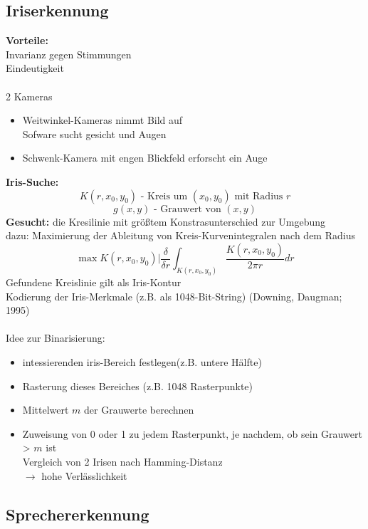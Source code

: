 \documentclass[a4paper,12pt]{scrreprt}
\newcommand{\Nb}[1]{\textbf{#1}}
\begin{document}
\subsection{Iriserkennung}

\Nb{Vorteile:}\\
Invarianz gegen Stimmungen\\
Eindeutigkeit\\
\\
2 Kameras
\begin{itemize}
 \item Weitwinkel-Kameras nimmt Bild auf\\
 Sofware sucht gesicht und Augen
 \item Schwenk-Kamera mit engen Blickfeld erforscht ein Auge
\end{itemize}
\Nb{Iris-Suche:}\\
$$K(r,x_0,y_0)\text{ -  Kreis um }(x_0,y_0)\text{ mit Radius }r$$
$$g(x,y)\text{  - Grauwert von }(x,y)$$
\Nb{Gesucht:} die Kresilinie mit größtem Konstrasunterschied zur Umgebung\\
dazu: Maximierung der Ableitung von Kreis-Kurvenintegralen nach dem Radius\\


$$ \max K(r,x_0,y_0) | \frac{\delta}{\delta r } \int_{K(r,x_0,y_0)} \frac{K(r,x_0,y_0)}{2 \pi r} dr$$
Gefundene Kreislinie gilt als Iris-Kontur\\
Kodierung der Iris-Merkmale (z.B. als 1048-Bit-String) (Downing, Daugman; 1995)\\
\\
Idee zur Binarisierung:
\begin{itemize}
 \item intessierenden iris-Bereich festlegen(z.B. untere Hälfte)
 \item Rasterung dieses Bereiches (z.B. 1048 Rasterpunkte)
 \item Mittelwert $m$ der Grauwerte berechnen
 \item Zuweisung von 0 oder 1 zu jedem Rasterpunkt, je nachdem, ob sein Grauwert > $m$ ist\\
 Vergleich von 2 Irisen nach Hamming-Distanz\\
 $\to$ hohe Verlässlichkeit
\end{itemize}

\subsection{Sprechererkennung}
\end{document}
